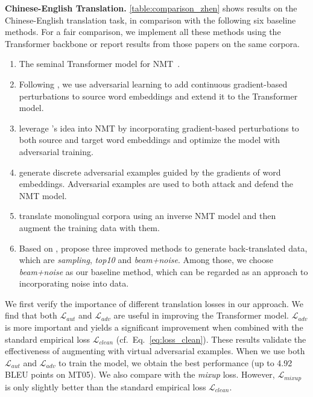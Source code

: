\documentclass[11pt,a4paper]{article}
\newcommand{\mixup}{\textit{mixup}\xspace}
\begin{document}
\textbf{Chinese-English Translation.}
\autoref{table:comparison_zhen} shows results on the Chinese-English translation task, in comparison with the following six baseline methods. For a fair comparison, we implement all these methods using the Transformer backbone or report results from those papers on the same corpora.
\begin{enumerate}[itemsep=0pt,parsep=0pt,leftmargin=3ex]
\item The seminal Transformer model for NMT~\cite{Vaswani:17}. 
\item Following \citet{Miyato:17}, we use adversarial learning to add continuous gradient-based perturbations to source word embeddings and extend it to the Transformer model.
\item \citet{Sano:19} leverage \citet{Miyato:17}'s idea into NMT by incorporating gradient-based perturbations to both source and target word embeddings and optimize the model with adversarial training. \item \citet{Cheng:19} generate discrete adversarial examples guided by the gradients of word embeddings. Adversarial examples are used to both attack and defend the NMT model.
\item \citet{Sennrich:16b} translate monolingual corpora using an inverse NMT model and then augment the training data with them.
\item Based on \citet{Sennrich:16b}, \citet{Edunov:18} propose three improved methods to generate back-translated data, which are {\em sampling}, {\em top10} and {\em beam+noise}. Among those, we choose {\em beam+noise} as our baseline method, which can be regarded as an approach to incorporating noise into data.
\end{enumerate}

We first verify the importance of different translation losses in our approach.
We find that both $\mathcal{L}_{aut}$ and $\mathcal{L}_{adv}$ are useful in improving the Transformer model. $\mathcal{L}_{adv}$ is more important and yields a significant improvement when combined with the standard empirical loss $\mathcal{L}_{clean}$ (cf.~Eq.~\eqref{eq:loss_clean}). These results validate the effectiveness of augmenting with virtual adversarial examples. When we use both $\mathcal{L}_{aut}$ and $\mathcal{L}_{adv}$ to train the model, we obtain the best performance (up to 4.92 BLEU points on MT05). We also compare with the \mixup loss. However, $\mathcal{L}_{mixup}$ is only slightly better than the standard empirical loss $\mathcal{L}_{clean}$.
\end{document}
